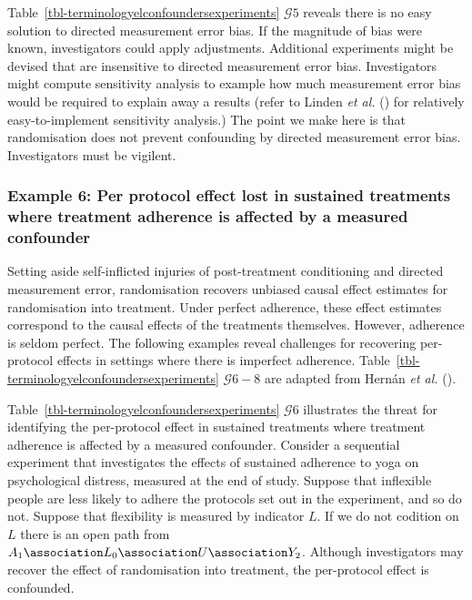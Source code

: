 \documentclass[
  single column]{article}
\begin{document}
Table~\ref{tbl-terminologyelconfoundersexperiments} \(\mathcal{G} 5\)
reveals there is no easy solution to directed measurement error bias. If
the magnitude of bias were known, investigators could apply adjustments.
Additional experiments might be devised that are insensitive to directed
measurement error bias. Investigators might compute sensitivity analysis
to example how much measurement error bias would be required to explain
away a results (refer to Linden \emph{et al.}
() for relatively easy-to-implement
sensitivity analysis.) The point we make here is that randomisation does
not prevent confounding by directed measurement error bias.
Investigators must be vigilent.

\subsubsection{Example 6: Per protocol effect lost in sustained
treatments where treatment adherence is affected by a measured
confounder}\label{example-6-per-protocol-effect-lost-in-sustained-treatments-where-treatment-adherence-is-affected-by-a-measured-confounder}

Setting aside self-inflicted injuries of post-treatment conditioning and
directed measurement error, randomisation recovers unbiased causal
effect estimates for randomisation into treatment. Under perfect
adherence, these effect estimates correspond to the causal effects of
the treatments themselves. However, adherence is seldom perfect. The
following examples reveal challenges for recovering per-protocol effects
in settings where there is imperfect adherence.
Table~\ref{tbl-terminologyelconfoundersexperiments} \(\mathcal{G} 6-8\)
are adapted from Hernán \emph{et al.}
().

Table~\ref{tbl-terminologyelconfoundersexperiments} \(\mathcal{G} 6\)
illustrates the threat for identifying the per-protocol effect in
sustained treatments where treatment adherence is affected by a measured
confounder. Consider a sequential experiment that investigates the
effects of sustained adherence to yoga on psychological distress,
measured at the end of study. Suppose that inflexible people are less
likely to adhere the protocols set out in the experiment, and so do not.
Suppose that flexibility is measured by indicator \(L\). If we do not
codition on \(L\) there is an open path from
\(A_1 \association L_0 \association U \association Y_2\). Although
investigators may recover the effect of randomisation into treatment,
the per-protocol effect is confounded.
\end{document}
